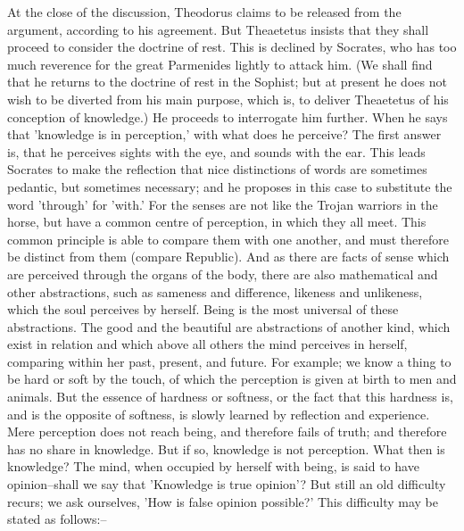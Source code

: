 At the close of the discussion, Theodorus claims to be released from the
argument, according to his agreement. But Theaetetus insists that they
shall proceed to consider the doctrine of rest. This is declined by
Socrates, who has too much reverence for the great Parmenides lightly
to attack him. (We shall find that he returns to the doctrine of rest
in the Sophist; but at present he does not wish to be diverted from
his main purpose, which is, to deliver Theaetetus of his conception of
knowledge.) He proceeds to interrogate him further. When he says that
'knowledge is in perception,' with what does he perceive? The first
answer is, that he perceives sights with the eye, and sounds with the
ear. This leads Socrates to make the reflection that nice distinctions
of words are sometimes pedantic, but sometimes necessary; and he
proposes in this case to substitute the word 'through' for 'with.' For
the senses are not like the Trojan warriors in the horse, but have
a common centre of perception, in which they all meet. This common
principle is able to compare them with one another, and must therefore
be distinct from them (compare Republic). And as there are facts of
sense which are perceived through the organs of the body, there are also
mathematical and other abstractions, such as sameness and difference,
likeness and unlikeness, which the soul perceives by herself. Being is
the most universal of these abstractions. The good and the beautiful are
abstractions of another kind, which exist in relation and which above
all others the mind perceives in herself, comparing within her past,
present, and future. For example; we know a thing to be hard or soft by
the touch, of which the perception is given at birth to men and animals.
But the essence of hardness or softness, or the fact that this hardness
is, and is the opposite of softness, is slowly learned by reflection and
experience. Mere perception does not reach being, and therefore fails of
truth; and therefore has no share in knowledge. But if so, knowledge
is not perception. What then is knowledge? The mind, when occupied
by herself with being, is said to have opinion--shall we say that
'Knowledge is true opinion'? But still an old difficulty recurs; we
ask ourselves, 'How is false opinion possible?' This difficulty may be
stated as follows:--

